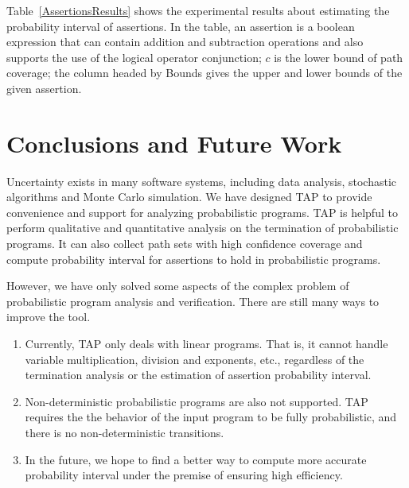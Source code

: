 \documentclass[sigconf,review, anonymous]{acmart}
\begin{document}
Table~\ref{AssertionsResults} shows the experimental results about estimating the probability interval of assertions. In the table, an assertion is a boolean expression that can contain addition and subtraction operations and  also supports the use of the logical operator conjunction; $c$ is the lower bound of path coverage; the column headed by Bounds gives the upper and lower bounds of the given assertion. %


\section{Conclusions and Future Work}
Uncertainty exists in many software systems, including data analysis, stochastic algorithms and Monte Carlo simulation. We have designed TAP  to provide convenience and support for analyzing probabilistic programs.
TAP is helpful to perform qualitative and quantitative analysis on the termination of probabilistic programs. It can also collect path sets with high confidence coverage and compute  probability interval for assertions to hold in probabilistic programs.


However, we have only solved some aspects of the complex problem of probabilistic program analysis and verification. There are still many ways to improve the tool.
\begin{enumerate}
	\item Currently, TAP only deals with linear programs. That is, it cannot handle variable multiplication, division and exponents, etc., regardless of the termination analysis or the estimation of assertion probability interval.
	\item Non-deterministic probabilistic programs  are also not supported. TAP requires the the behavior of the input program to be fully probabilistic, and there is no non-deterministic transitions. 
	\item In the future, we hope to find a better way to compute more accurate probability interval under the premise of ensuring high efficiency. 
\end{enumerate}




\end{document}
